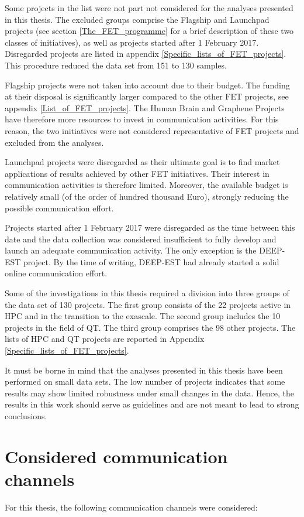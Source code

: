 Some projects in the list were not part not considered for the analyses presented in this thesis. The excluded groups comprise the Flagship and Launchpad projects (see section \ref{The_FET_programme} for a brief description of these two classes of initiatives), as well as projects started after 1 February 2017. Disregarded projects are listed in appendix \ref{Specific_lists_of_FET_projects}. This procedure reduced the data set from 151 to 130 samples.

Flagship projects were not taken into account due to their budget. The funding at their disposal is significantly larger compared to the other FET projects, see appendix \ref{List_of_FET_projects}. The Human Brain and Graphene Projects have therefore more resources to invest in communication activities. For this reason, the two initiatives were not considered representative of FET projects and excluded from the analyses. 

Launchpad projects were disregarded as their ultimate goal is to find market applications of results achieved by other FET initiatives. Their interest in communication activities is therefore limited. Moreover, the available budget is relatively small (of the order of hundred thousand Euro), strongly reducing the possible communication effort. 

Projects started after 1 February 2017 were disregarded as the time between this date and the data collection was considered insufficient to fully develop and launch an adequate communication activity. The only exception is the DEEP-EST project. By the time of writing, DEEP-EST had already started a solid online communication effort.    

Some of the investigations in this thesis required a division into three groups of the data set of 130 projects. The first group consists of the 22 projects active in HPC and in the transition to the exascale. The second group includes the 10 projects in the field of QT. The third group comprises the 98 other projects. The lists of HPC and QT projects are reported in Appendix \ref{Specific_lists_of_FET_projects}.

It must be borne in mind that the analyses presented in this thesis have been performed on small data sets. The low number of projects indicates that some results may show limited robustness under small changes in the data. Hence, the results in this work should serve as guidelines and are not meant to lead to strong conclusions.  

\section{Considered communication channels} \label{Considered_channels}
For this thesis, the following communication channels were considered:   

